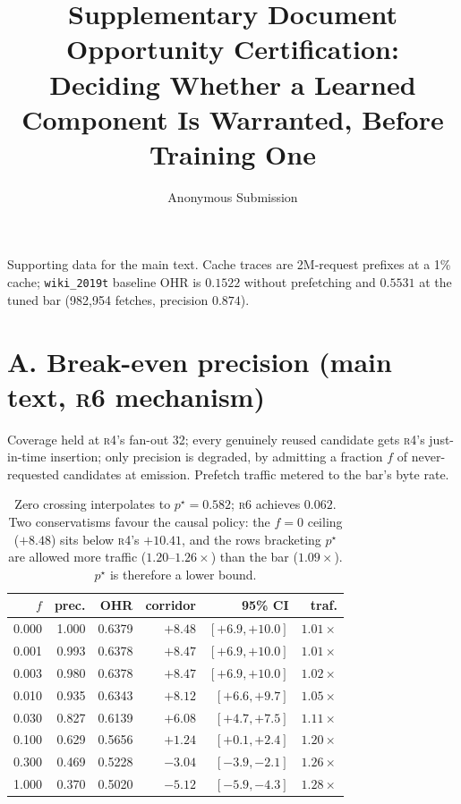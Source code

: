 \documentclass[letterpaper]{article} %
\title{Supplementary Document\\ Opportunity Certification: Deciding Whether a Learned Component Is Warranted, Before Training One}
\author{Anonymous Submission}
\newcommand{\rung}[1]{\textsc{#1}}
\begin{document}
\maketitle

\noindent Supporting data for the main text. Cache traces are 2M-request prefixes at a 1\% cache;
\texttt{wiki\_2019t} baseline OHR is $0.1522$ without prefetching and $0.5531$ at the tuned bar
(982{,}954 fetches, precision $0.874$).

\section{A. Break-even precision (main text, \rung{r6} mechanism)}

\noindent Coverage held at \rung{r4}'s fan-out 32; every genuinely reused candidate gets \rung{r4}'s
just-in-time insertion; only precision is degraded, by admitting a fraction $f$ of never-requested
candidates at emission. Prefetch traffic metered to the bar's byte rate.

\begin{table}[htbp]
\centering\footnotesize
\setlength{\tabcolsep}{3pt}
\begin{tabular}{rrrrrr}
\toprule
$f$ & prec. & OHR & corridor & 95\% CI & traf. \\
\midrule
0.000 & 1.000 & 0.6379 & $+8.48$ & $[+6.9,+10.0]$ & $1.01\times$ \\
0.001 & 0.993 & 0.6378 & $+8.47$ & $[+6.9,+10.0]$ & $1.01\times$ \\
0.003 & 0.980 & 0.6378 & $+8.47$ & $[+6.9,+10.0]$ & $1.02\times$ \\
0.010 & 0.935 & 0.6343 & $+8.12$ & $[+6.6,+9.7]$ & $1.05\times$ \\
0.030 & 0.827 & 0.6139 & $+6.08$ & $[+4.7,+7.5]$ & $1.11\times$ \\
0.100 & 0.629 & 0.5656 & $+1.24$ & $[+0.1,+2.4]$ & $1.20\times$ \\
0.300 & 0.469 & 0.5228 & $-3.04$ & $[-3.9,-2.1]$ & $1.26\times$ \\
1.000 & 0.370 & 0.5020 & $-5.12$ & $[-5.9,-4.3]$ & $1.28\times$ \\
\bottomrule
\end{tabular}
\caption{Zero crossing interpolates to $p^{\star}=0.582$; \rung{r6} achieves $0.062$. Two
conservatisms favour the causal policy: the $f{=}0$ ceiling ($+8.48$) sits below \rung{r4}'s
$+10.41$, and the rows bracketing $p^{\star}$ are allowed more traffic ($1.20$--$1.26\times$) than
the bar ($1.09\times$). $p^{\star}$ is therefore a lower bound.}
\label{tab:s-prec}
\end{table}
\end{document}
